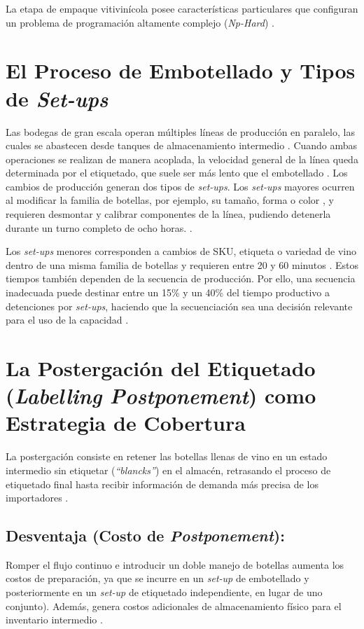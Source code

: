 La etapa de empaque vitivinícola posee características particulares que configuran un problema de programación altamente complejo (\textit{Np-Hard}) \cite{maccawley2022, varas2018}.

\section{El Proceso de Embotellado y Tipos de \textit{Set-ups}\label{sec:sec1}}
Las bodegas de gran escala operan múltiples líneas de producción en paralelo, las cuales se abastecen desde tanques de almacenamiento intermedio \cite{varas2018}.
Cuando ambas operaciones se realizan de manera acoplada, la
velocidad general de la línea queda determinada por el etiquetado, que suele ser más lento que el embotellado \cite{varas2018}. Los cambios de producción generan dos tipos de \textit{set-ups}. Los \textit{set-ups} mayores ocurren al modificar la familia de botellas, por ejemplo, su tamaño, forma o color \cite{bouzdine2011}, y requieren desmontar y calibrar componentes de la línea, pudiendo detenerla durante un turno completo de ocho horas. \cite{maccawley2022}. 

Los \textit{set-ups} menores corresponden a cambios de SKU, etiqueta o variedad de vino dentro de una misma familia de botellas y requieren entre 20 y 60 minutos \cite{maccawley2022}. Estos tiempos también dependen de la secuencia de producción. Por ello, una secuencia inadecuada puede destinar entre un 15\% y un 40\% del tiempo productivo a detenciones por \textit{set-ups}, haciendo que la secuenciación sea una decisión relevante para el uso de la capacidad \cite{maccawley2022}.

\section{La Postergación del Etiquetado (\textit{Labelling Postponement}) como Estrategia de Cobertura\label{sec:sec3}}

La postergación consiste en retener las botellas llenas de vino en un estado intermedio sin etiquetar (\textit{“blancks”}) en el almacén, retrasando el proceso de etiquetado final hasta recibir información de demanda más precisa de los importadores \cite{cholette2009, varas2018}.

\subsection{Desventaja (Costo de \textit{Postponement}): \label{sec:sub1_desv}}
Romper el flujo continuo e introducir un doble manejo de botellas aumenta los costos de preparación, ya que se incurre en un \textit{set-up} de embotellado y posteriormente en un \textit{set-up} de etiquetado independiente, en lugar de uno conjunto). Además, genera costos adicionales de almacenamiento físico para el inventario intermedio \cite{cholette2009, varas2018}.

